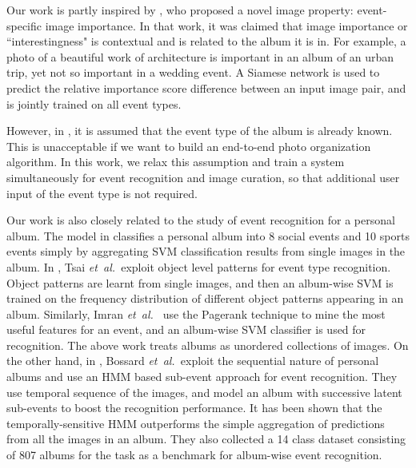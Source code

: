 \documentclass[runningheads]{llncs}
\newcommand{\etal}{\mbox{\emph{et al.\ }}}
\begin{document}
Our work is partly inspired by \cite{CVPR}, who proposed a novel image property: event-specific image importance. In that work, it was claimed that image importance or ``interestingness" is contextual and is related to the album it is in. For example, a photo of a beautiful work of architecture is important in an album of an urban trip, yet not so important in a wedding event.  A Siamese network is used to predict the relative importance score difference between an input image pair, and is jointly trained on all event types.

However, in \cite{CVPR}, it is assumed that the event type of the album is already known. This is unacceptable if we want to build an end-to-end photo organization algorithm. In this work, we relax this assumption and train a system simultaneously for event recognition and image curation, so that additional user input of the event type is not required.


Our work is also closely related to the study of event recognition for a personal album. The model in \cite{Mattivi11} classifies a personal album into 8 social events and 10 sports events simply by aggregating SVM classification results from single images in the album. In \cite{pattern}, Tsai \etal exploit object level patterns for event type recognition. Object patterns are learnt from single images,  and then an album-wise SVM is trained on the frequency distribution of different object patterns appearing in an album. Similarly, Imran \etal \cite{Imran09} use the Pagerank technique to mine the most useful features for an event, and an album-wise SVM classifier is used for recognition.
%
%
%
%
%
%
The above work treats albums as unordered collections of images. On the other hand, in \cite{HMM}, Bossard \etal exploit the sequential nature of personal albums and use an HMM based sub-event approach for event recognition. They use temporal sequence of the images, and model an album with successive latent sub-events to boost the recognition performance. It has been shown that the temporally-sensitive HMM outperforms the simple aggregation of predictions from all the images in an album.  They also collected a 14 class dataset consisting of 807 albums for the task as a benchmark for album-wise event recognition. 
%
%
%
\end{document}
